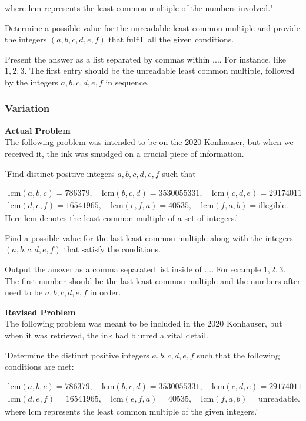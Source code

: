 where lcm represents the least common multiple of the numbers involved."

Determine a possible value for the unreadable least common multiple and provide the integers $(a, b, c, d, e, f)$ that fulfill all the given conditions.

Present the answer as a list separated by commas within $\boxed{...}$. For instance, like $\boxed{1, 2, 3}$. The first entry should be the unreadable least common multiple, followed by the integers $a, b, c, d, e, f$ in sequence.

\subsubsection{Variation}
\textbf{Actual Problem}\\
The following problem was intended to be on the 2020 Konhauser, but when we received it, the ink was smudged on a crucial piece of information.

'Find distinct positive integers $a, b, c, d, e, f$ such that

$$
\begin{aligned}
 \text{lcm}(a, b, c) = 786379, \quad \text{lcm}(b, c, d) = 3530055331, \quad \text{lcm}(c, d, e) = 29174011 \\
   \text{lcm}(d, e, f) = 16541965, \quad \text{lcm}(e, f, a) = 40535, \quad \text{lcm}(f, a, b) = \text{illegible}.
\end{aligned}
$$
Here lcm denotes the least common multiple of a set of integers.'

Find a possible value for the last least common multiple along with the integers $(a,b,c,d,e,f)$ that satisfy the conditions.

Output the answer as a comma separated list inside of $\boxed{...}$. For example $\boxed{1, 2, 3}$.
The first number should be the last least common multiple and the numbers after need to be $a,b,c,d,e,f$ in order.

\textbf{Revised Problem}\\
The following problem was meant to be included in the 2020 Konhauser, but when it was retrieved, the ink had blurred a vital detail.

'Determine the distinct positive integers $a, b, c, d, e, f$ such that the following conditions are met:

$$
\begin{aligned}
 \text{lcm}(a, b, c) = 786379, \quad \text{lcm}(b, c, d) = 3530055331, \quad \text{lcm}(c, d, e) = 29174011 \\
   \text{lcm}(d, e, f) = 16541965, \quad \text{lcm}(e, f, a) = 40535, \quad \text{lcm}(f, a, b) = \text{unreadable}.
\end{aligned}
$$
where lcm represents the least common multiple of the given integers.'

